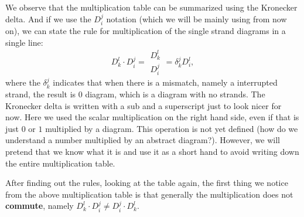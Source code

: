 \documentclass[10pt,a4paper]{article}
\newcommand{\DD}[2]{\boxed{D_{#1}^{#2}}}
\begin{document}
	We observe that the multiplication table can be summarized using the Kronecker delta. And if we use the $\DD ij$ notation (which we will be mainly using from now on), we can state the rule for multiplication of the single strand diagrams in a single line: 
	\begin{equation}
	\DD kl \cdot \DD ij = \substack{\DD kl\\ \DD ij} =\delta_{k}^{j} \DD il, \label{PlanarDiagramMultiplicationRule}
	\end{equation}
	where the $\delta_{k}^{j}$ indicates that when there is a mismatch, namely a interrupted strand, the result is $0$ diagram, which is a diagram with no strands. The Kronecker delta is written with a sub and a superscript just to look nicer for now. Here we used the scalar multiplication on the right hand side, even if that is just $0$ or $1$ multiplied by a diagram. This operation is not yet defined (how do we understand a number multiplied by an abstract diagram?). However, we will pretend that we know what it is and use it as a short hand to avoid writing down the entire multiplication table. 

	After finding out the rules, looking at the table again, the first thing we notice from the above multiplication table is that generally the multiplication does not \textbf{commute}, namely $\DD kl \cdot \DD ij \neq \DD ij  \cdot \DD kl $. 
	
\end{document}
